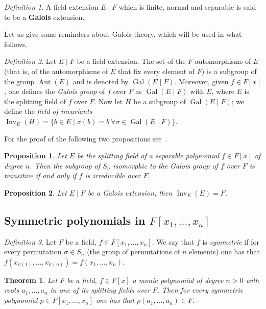 \documentclass[11pt]{article}
\theoremstyle{plain}
\newtheorem{theorem}{Theorem}
\newtheorem{proposition}{Proposition}
\theoremstyle{definition}
\theoremstyle{remark}
\newtheorem*{definition*}{Definition}
\newcommand{\Gal}{\operatorname{Gal}}
\newcommand{\Aut}{\operatorname{Aut}}
\newcommand{\Inv}{\operatorname{Inv}}
\begin{document}
\begin{definition*}
A field extension $E\mid F$ which is finite, normal and separable is
said to be a \textbf{Galois} extension.
\end{definition*}

Let us give some reminders about Galois theory, which will be used in
what follows.

\begin{definition*}
Let $E\mid F$ be a field extension. The set of the $F$-automorphisms of
$E$ (that is, of the automorphisms of $E$ that fix every element of $F$)
is a subgroup of the group $\Aut(E)$ and is denoted by $\Gal(E\mid F)$.
Moreover, given $f \in F[x]$, one defines the \emph{Galois group} of
$f$ over $F$ as $\Gal(E\mid F)$ with $E$, where $E$ is the splitting
field of $f$ over $F$. Now let $H$ be a subgroup of $\Gal(E\mid F)$; we
define the \emph{field of invariants}
$\Inv_{E}(H) = \{ b \in E \mid \sigma(b) = b\ \forall \sigma \in
\Gal(E\mid F) \}$.
\end{definition*}

For the proof of the following two propositions see~\cite{Casolo}.

\begin{proposition}\label{prop:transitive}
Let $E$ be the splitting field of a separable polynomial
$f \in F[x]$ of degree $n$. Then the subgroup of $S_{n}$ isomorphic to
the Galois group of $f$ over $F$ is transitive if and only if $f$ is
irreducible over $F$.
\end{proposition}

\begin{proposition}\label{prop:inv}
Let $E\mid F$ be a Galois extension; then $\Inv_{E}(E) = F$.
\end{proposition}

\subsection*{Symmetric polynomials in $F[x_{1}, \ldots, x_{n}]$}

\begin{definition*}
Let $F$ be a field, $f \in F[x_{1}, \ldots, x_{n}]$. We say that $f$ is
\emph{symmetric} if for every permutation $\sigma \in S_{n}$ (the group
of permutations of $n$ elements) one has that
$f(x_{\sigma(1)}, \ldots, x_{\sigma(n)}) = f(x_{1}, \ldots, x_{n})$.
\end{definition*}

\begin{theorem}\label{thm:sym}
Let $F$ be a field, $f \in F[x]$ a monic polynomial of degree $n > 0$
with roots $a_{1}, \ldots, a_{n}$ in one of its splitting fields over
$F$. Then for every symmetric polynomial
$p \in F[x_{1}, \ldots, x_{n}]$ one has that
$p(a_{1}, \ldots, a_{n}) \in F$.
\end{theorem}
\end{document}
